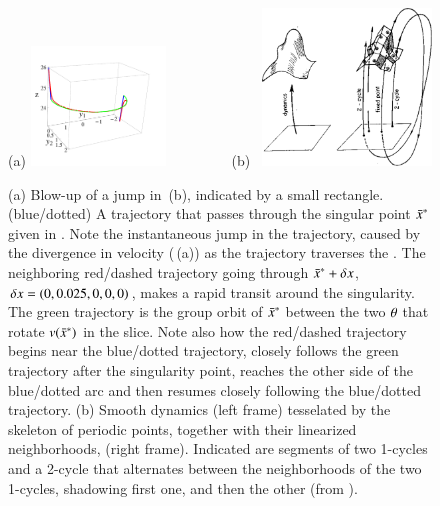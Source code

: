 \documentclass[preprint,12pt]{elsarticle} %
\begin{document}
 \begin{figure}
 \begin{center}
(a) \includegraphics[width=0.32\textwidth]{singpass1}%
~~~~~~~~
(b)~ \includegraphics[width=0.40\textwidth]{f_1_08_1}
 \end{center}
 \caption{\label{fig:singpass}
(a)
Blow-up of a jump in \,(b), indicated by a small
rectangle.
(blue/dotted) A trajectory that passes through the singular point
$\bar{x}^*$ given in . Note the instantaneous jump in
the trajectory,  caused by the divergence in velocity
(\,(a)) as the trajectory traverses the {\sset}.
The neighboring red/dashed trajectory going through $\bar{x}^*+\delta
x$, $\delta x =(0,0.025,0,0,0)$, makes a rapid transit around the
singularity. The green trajectory is the group orbit of $\bar{x}^*$
between the two ${\bf \theta}$ that rotate $v(\bar{x}^*)$ in the slice. Note
also how the red/dashed trajectory begins near the blue/dotted
trajectory, closely follows the green trajectory after the singularity
point, reaches the other side of the blue/dotted arc and then resumes
closely following the blue/dotted trajectory.
(b)
Smooth dynamics  (left frame) tesselated by the skeleton of periodic
points, together with their linearized neighborhoods, (right frame).
Indicated are segments of two 1-cycles and a 2-cycle that alternates
between the neighborhoods of the two 1-cycles, shadowing first one, and
then the other
(from \wwwcb{}).
 }%
 \end{figure}
\end{document}
